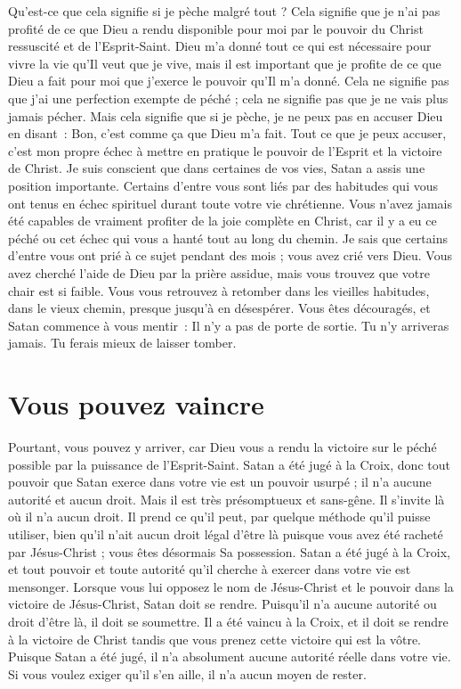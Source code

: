 Qu'est-ce que cela signifie si je pèche malgré tout ?
 Cela signifie que je n'ai pas profité de ce que Dieu a rendu disponible
 pour moi par le pouvoir du Christ ressuscité et de l'Esprit-Saint.
 Dieu m'a donné tout ce qui est nécessaire pour vivre la vie
 qu'Il veut que je vive, mais il est important que je profite
 de ce que Dieu a fait pour moi \ocadr que j'exerce le pouvoir
 qu'Il m'a donné.
 Cela ne signifie pas que j'ai une perfection exempte de péché ;
 cela ne signifie pas que je ne vais plus jamais pécher.
 Mais cela signifie que si je pèche, je ne peux pas en accuser Dieu
 en disant~:
 \og Bon, c'est comme ça que Dieu m'a fait. \fg{}
 Tout ce que je peux accuser, c'est mon propre échec à mettre en pratique
 le pouvoir de l'Esprit et la victoire de Christ.
 Je suis conscient que dans certaines de vos vies,
 Satan a assis une position importante.
 Certains d'entre vous sont liés par des habitudes qui vous ont tenus
 en échec spirituel durant toute votre vie chrétienne.
 Vous n'avez jamais été capables de vraiment profiter de la joie complète
 en Christ, car il y a eu ce péché ou cet échec qui vous a hanté
 tout au long du chemin. Je sais que certains d'entre vous ont prié
 à ce sujet pendant des mois ; vous avez crié vers Dieu.
 Vous avez cherché l'aide de Dieu par la prière assidue,
 mais vous trouvez que votre chair est si faible.
 Vous vous retrouvez à retomber dans les vieilles habitudes,
 dans le vieux chemin, presque jusqu'à en désespérer.
 Vous êtes découragés, et Satan commence à vous mentir~:
 \og Il n'y a pas de porte de sortie. Tu n'y arriveras jamais.
 Tu ferais mieux de laisser tomber. \fg{}


\section*{Vous pouvez vaincre}

Pourtant, vous pouvez y arriver, car Dieu vous a rendu la victoire
 sur le péché possible par la puissance de l'Esprit-Saint.
 Satan a été jugé à la Croix, donc tout pouvoir que Satan exerce
 dans votre vie est un pouvoir usurpé ; il n'a aucune autorité et aucun droit.
 Mais il est très présomptueux et sans-gêne. Il s'invite là où il n'a aucun
 droit. Il prend ce qu'il peut, par quelque méthode qu'il puisse utiliser,
 bien qu'il n'ait aucun droit légal d'être là puisque vous avez été racheté
 par Jésus-Christ ; vous êtes désormais Sa possession.
 Satan a été jugé à la Croix, et tout pouvoir et toute autorité qu'il cherche
 à exercer dans votre vie est mensonger.
 Lorsque vous lui opposez le nom de Jésus-Christ et le pouvoir
 dans la victoire de Jésus-Christ, Satan doit se rendre.
 Puisqu'il n'a aucune autorité ou droit d'être là, il doit se soumettre.
 Il a été vaincu à la Croix, et il doit se rendre à la victoire de Christ
 tandis que vous prenez cette victoire qui est la vôtre.
 Puisque Satan a été jugé, il n'a absolument aucune autorité réelle
 dans votre vie. Si vous voulez exiger qu'il s'en aille,
 il n'a aucun moyen de rester.


